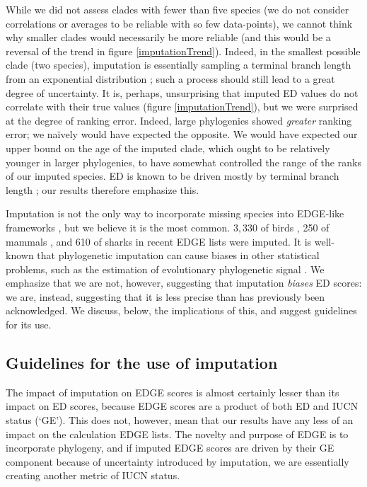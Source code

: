 \documentclass[12pt,english]{article}
\begin{document}
While we did not assess clades with fewer than five species (we do not consider
correlations or averages to be reliable with so few data-points), we cannot
think why smaller clades would necessarily be more reliable (and this would be a
reversal of the trend in figure \ref{imputationTrend}). Indeed, in the smallest
possible clade (two species), imputation is essentially sampling a terminal
branch length from an exponential distribution \autocite{Kuhn2011}; such a
process should still lead to a great degree of uncertainty. It is, perhaps,
unsurprising that imputed ED values do not correlate with their true values (figure
\ref{imputationTrend}), but we were surprised at the degree of ranking error.
Indeed, large phylogenies showed \emph{greater} ranking error; we na\"{i}vely
would have expected the opposite. We would have expected our upper bound on the
age of the imputed clade, which ought to be relatively younger
in larger phylogenies, to have somewhat controlled the range of the ranks of our
imputed species. ED is known to be driven mostly by terminal branch length
\autocite{Isaac2007,Steel2007}; our results therefore emphasize this.

Imputation is not the only way to incorporate missing species into EDGE-like
frameworks \autocite{Gumbs2017, Collen2011}, but we believe it is the most
common. $3,330$ of birds \autocite[\textasciitilde30\%;][]{Jetz2014}, 250 of
mammals \autocite[\textasciitilde 5.6\%;][]{Collen2011}, and 610 of sharks
\autocite[\textasciitilde49\%;][]{Stein2018} in recent EDGE lists were imputed.
It is well-known that phylogenetic imputation can cause biases in other statistical
problems, such as the estimation of evolutionary phylogenetic signal \autocite{Rabosky2014}. We emphasize
that we are not, however, suggesting that imputation \emph{biases} ED scores: we
are, instead, suggesting that it is less precise than has previously been
acknowledged. We discuss, below, the implications of this, and suggest
guidelines for its use.

\subsection*{Guidelines for the use of imputation}
The impact of imputation on EDGE scores is almost certainly lesser than its
impact on ED scores, because EDGE scores are a product of both ED and IUCN
status (`GE'). This does not, however, mean that our results have any less of
an impact on the calculation EDGE lists. The novelty and purpose of EDGE \autocite[and related metrics; \emph{e.g.},][]{Steel2007,Faith2008,Pearse2015,Jensen2016} is to incorporate
phylogeny, and if imputed EDGE scores are driven by their GE component because of
uncertainty introduced by imputation, we are essentially creating another metric
of IUCN status.
\end{document}
